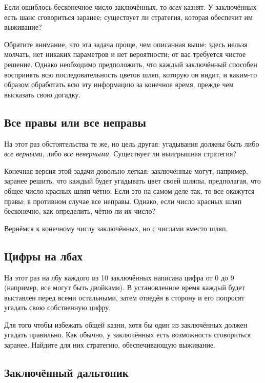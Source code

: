 Если ошиблось бесконечное число заключённых, то \emph{всех} казнят. 
У заключённых есть шанс сговориться заранее;
существует ли стратегия, которая обеспечит им выживание?

Обратите внимание, что эта задача проще, чем описанная выше:
здесь нельзя молчать, нет никаких параметров и нет вероятности;
от вас требуется чистое решение.
Однако необходимо предположить, что каждый заключённый способен воспринять всю последовательность цветов шляп, которую он видит, и каким-то образом обработать всю эту информацию за конечное время, прежде чем высказать свою догадку.


\subsection*{Все правы или все неправы}

На этот раз обстоятельства те же, но цель другая:
угадывания должны быть либо \emph{все верными}, либо \emph{все неверными}.
Существует ли выигрышная стратегия?

Конечная версия этой задачи довольно лёгкая:
заключённые могут, например, заранее решить, что каждый будет угадывать цвет своей шляпы, предполагая, что общее число красных шляп чётно.
Если это на самом деле так, то все окажутся правы;
в противном случае все неправы.
Однако, если число красных шляп бесконечно, как определить, чётно ли их число?

\medskip

Вернёмся к конечному числу заключённых, но с числами вместо шляп.

\subsection*{Цифры на лбах}

На этот раз на лбу каждого из 10 заключённых написана цифра от 0 до 9 (например, все могут быть двойками).
В установленное время каждый будет выставлен перед всеми остальными, затем отведён в сторону и его попросят угадать свою собственную цифру.

Для того чтобы избежать общей казни, хотя бы один из заключённых должен угадать правильно.
Как обычно, у заключённых есть возможность сговориться заранее.
Найдите для них стратегию, обеспечивающую выживание.

\subsection*{Заключённый дальтоник}

